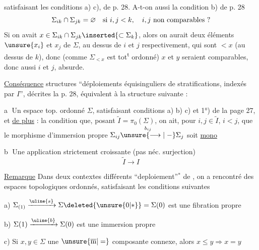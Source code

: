 satisfaisant les conditions a) c),  de p. 28.
A-t-on aussi la condition b) de p. 28
\[
\Sigma_{ik}\cap\Sigma_{jk}=\varnothing\quad\hbox{si }i,j<k,\quad
i,j\ \hbox{non comparables ?}
\]
Si on avait $x\in\Sigma_{ik}\cap\Sigma_{jk}\inserted{\subset\Sigma_k}$,
alors on aurait deux éléments $\unsure{x_i}$ et $x_j$ de $\Sigma$,
au dessus de $i$ et $j$ respectivement, qui sont $<x$
(au dessus de $k$), donc (comme $\Sigma_{<x}$ est tot\textsuperscript{t} ordonné)
 $x$ et $y$ seraient comparables, donc aussi
$i$ et $j$, absurde.

\uline{Conséquence}  structures ``déploiements
équisinguliers de stratifications, indexés par $I$'',
décrites  la p. 28, équivalent à la structure suivante :


\textcircled{a} Un \deleted{$\Sigma$} espace top. ordonné $\Sigma$,
satisfaisant  conditions a) b) c) et 1°) de la page 27,
et \uline{de plus} : la condition que, 
posant $\widetilde I=\pi_0(\Sigma)$, on ait, pour
$i,j\in\widetilde I$,
$i<j$, que le morphisme d'immersion
propre  $\Sigma_{ij}\overset{b_{ij}}{\unsure{\longrightarrow|\mathrel{-}}}\Sigma_j$ soit
\uline{mono}

\textcircled{b} Une application strictement croissante
(pas néc. surjection)
\[
\widetilde I\longrightarrow I
\]

\uline{Remarque} Dans deux contextes différents
``deploiement''$^{*}$ de  , on
a rencontré des espaces topologiques ordonnés\inserted{$\Sigma$},
satisfaisant les conditions suivantes


a) $\Sigma_{(1)}\xrightarrow{\uline{s}}\Sigma\deleted{\unsure{0|*}}=\Sigma(0)$
est une fibration propre

b) $\Sigma(1)\xrightarrow{\uline{b}}\Sigma(0)$ est une immersion propre

c) Si $x,y\in\Sigma$   une $\unsure{\overline{\mathrm m}|=}$ composante connexe,
alors $x\leq y\Longrightarrow x=y$

